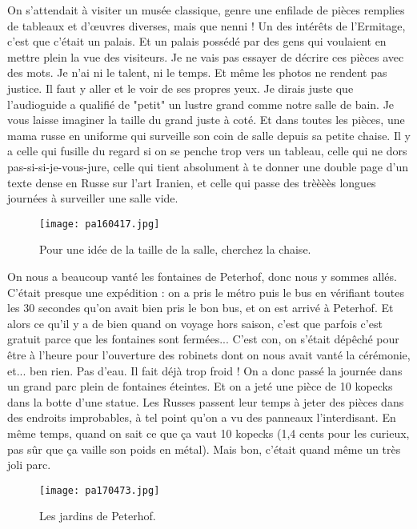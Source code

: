 \documentclass{book}
\begin{document}
On s'attendait à visiter un musée classique, genre une enfilade de pièces remplies de tableaux et d’œuvres diverses, mais que nenni ! Un des intérêts de l'Ermitage, c'est que c'était un palais. Et un palais possédé par des gens qui voulaient en mettre plein la vue des visiteurs. Je ne vais pas essayer de décrire ces pièces avec des mots. Je n'ai ni le talent, ni le temps. Et même les photos ne rendent pas justice. Il faut y aller et le voir de ses propres yeux. Je dirais juste que l'audioguide a qualifié de "petit" un lustre grand comme notre salle de bain. Je vous laisse imaginer la taille du grand juste à coté.
Et dans toutes les pièces, une mama russe en uniforme qui surveille son coin de salle depuis sa petite chaise. Il y a celle qui fusille du regard si on se penche trop vers un tableau, celle qui ne dors pas-si-si-je-vous-jure, celle qui tient absolument à te donner une double page d'un texte dense en Russe sur l'art Iranien, et celle qui passe des trèèèès longues journées à surveiller une salle vide.


\begin{figure}[h]
\centering
\texttt{[image: pa160417.jpg]}
\caption*{ Pour une idée de la taille de la salle, cherchez la chaise.}
\end{figure}

On nous a beaucoup vanté les fontaines de Peterhof, donc nous y sommes allés. C'était presque une expédition : on a pris le métro puis le bus en vérifiant toutes les 30 secondes qu'on avait bien pris le bon bus, et on est arrivé à Peterhof. Et alors ce qu'il y a de bien quand on voyage hors saison, c'est que parfois c'est gratuit parce que les fontaines sont fermées... C'est con, on s'était dépêché pour être à l'heure pour l'ouverture des robinets dont on nous avait vanté la cérémonie, et... ben rien. Pas d'eau. Il fait déjà trop froid ! On a donc passé la journée dans un grand parc plein de fontaines éteintes. Et on a jeté une pièce de 10 kopecks dans la botte d'une statue. Les Russes passent leur temps à jeter des pièces dans des endroits improbables, à tel point qu'on a vu des panneaux l'interdisant. En même temps, quand on sait ce que ça vaut 10 kopecks (1,4 cents pour les curieux, pas sûr que ça vaille son poids en métal).
Mais bon, c'était quand même un très joli parc.


\begin{figure}[h]
\centering
\texttt{[image: pa170473.jpg]}
\caption*{ Les jardins de Peterhof.}
\end{figure}
\end{document}
